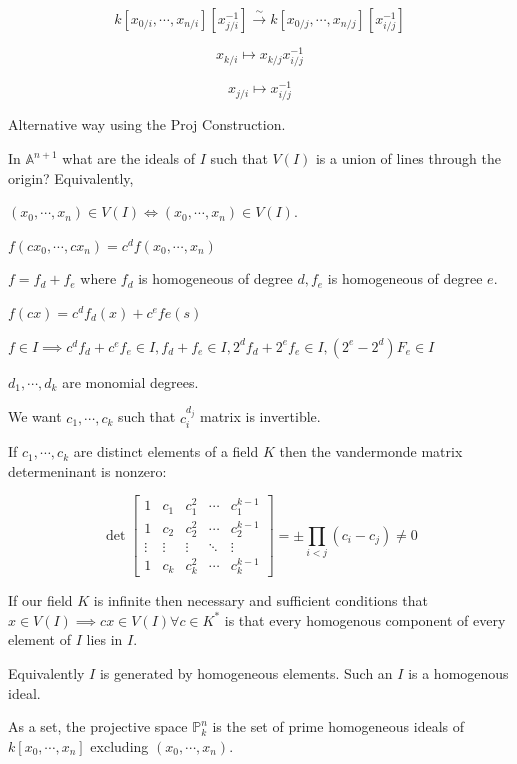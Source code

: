 \documentclass{article}
\theoremstyle{definition}
\begin{document}
    \[
        k[x_{0 / i}, \cdots , x_{n / i}][x_{j / i} ^{-1}] \xrightarrow{\sim} k[x_{0 / j}, \cdots , x_{n / j}][x_{i / j} ^{-1}]
    \]

    \[
        x_{k / i} \mapsto x_{k / j} x_{i / j} ^{-1} 
    \]

    \[
        x_{j / i} \mapsto x_{i / j} ^{-1}
    \]

    Alternative way using the Proj Construction.

    In \(\mathbb{A}^{n+1}\) what are the ideals of \(I\) such that \(V(I)\) is a union of lines through the origin? Equivalently,

    \((x_0, \cdots , x_n) \in V(I) \iff (x_0, \cdots , x_n) \in V(I)\).

    \(f(cx_0, \cdots , cx_n) = c^df(x_0, \cdots , x_n)\) 

    \(f = f_d + f_e\) where \(f_d\) is homogeneous of degree \(d, f_e\) is homogeneous of degree \(e\).

    \(f(cx) = c^d f_d(x) + c^e fe(s)\) 

    \(f\in I \implies c^d f_d +c^e f_e \in I, f_d + f_e \in I, 2^d f_d + 2^e f_e \in I, (2^e - 2^d) F_e \in I\)
    
    \(d_1, \cdots , d_k\) are monomial degrees.

    We want \(c_1, \cdots , c_k\) such that \(c_i^{d_j}\) matrix is invertible.

    If \(c_1, \cdots , c_k\) are distinct elements of a field \(K\) then the vandermonde matrix determeninant is nonzero:

    \[
        \det \begin{bmatrix}
            1 & c_1 & c_1^2 & \cdots & c_1^{k-1} \\
            1 & c_2 & c_2^2 & \cdots & c_2^{k-1} \\
            \vdots & \vdots & \vdots & \ddots & \vdots \\
            1 & c_k & c_k^2 & \cdots & c_k^{k-1}
        \end{bmatrix} = \pm\prod_{i < j} (c_i - c_j) \neq 0
    \]

    If our field \(K\) is infinite then necessary and sufficient conditions that \(x \in V(I) \implies cx \in V(I) \forall c\in K^{\ast}\) is that every homogenous component of every element of \(I\) lies in \(I\).

    Equivalently \(I\) is generated by homogeneous elements. Such an \(I\) is a homogenous ideal.

    As a set, the projective space \(\mathbb{P}^n_k\) is the set of prime homogeneous ideals of \(k[x_0, \cdots ,x_n]\) excluding \((x_0, \cdots , x_n)\).
\end{document}
